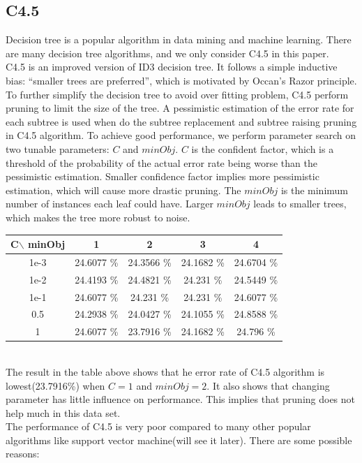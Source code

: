 \documentclass[a4paper,11pt]{article}
\begin{document}
\subsection{C4.5}
Decision tree is a popular algorithm in data mining and machine learning. There are many decision tree algorithms, and we only consider C4.5 in this paper.\\
C4.5 is an improved version of ID3 decision tree. It follows a simple inductive bias: ``smaller trees are preferred'', which is motivated by Occan's Razor principle. To further simplify the decision tree to avoid over fitting problem, C4.5 perform pruning to limit the size of the tree. A pessimistic estimation of the error rate for each subtree is used when do the subtree replacement and subtree raising pruning in C4.5 algorithm. To achieve good performance, we perform parameter search on two tunable parameters: $C$ and $minObj$. $C$ is the confident factor, which is a threshold of the probability of the actual error rate being worse than the pessimistic estimation\cite{morgan.kaufmann}. Smaller confidence factor implies more pessimistic estimation, which will cause more drastic pruning. The $minObj$ is the minimum number of instances each leaf could have. Larger $minObj$ leads to smaller trees, which makes the tree more robust to noise.
\vspace{0.5cm}\\
\begin{tabular}{c|c c c c}
C$\backslash$ minObj	&1		&2		&3		&4\\
\hline \hline
1e-3 	&24.6077 \%	&24.3566 \%	&24.1682 \%	 &24.6704 \%\\
1e-2	&24.4193 \%	 &24.4821 \%	&24.231  \%	 &24.5449 \%\\
1e-1	&24.6077 \%	&24.231  \%	&24.231  \%	 &24.6077 \%\\
0.5 &24.2938 \%     &24.0427 \% &24.1055 \%  &24.8588 \%\\
1	&24.6077 \%	    &23.7916 \%	&24.1682 \%	 &24.796  \%\\
\end{tabular}
\vspace{0.5cm}\\
The result in the table above shows that he error rate of C4.5 algorithm is lowest(23.7916\%) when $C=1$ and $minObj=2$. It also shows that changing parameter has little influence on performance. This implies that pruning does not help much in this data set.\\
The performance of C4.5 is very poor compared to many other popular algorithms like support vector machine(will see it later). There are some possible reasons:\\
\end{document}
